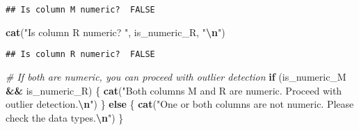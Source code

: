 \documentclass[
]{article}
\newenvironment{Shaded}{\begin{snugshade}}{\end{snugshade}}
\newcommand{\CommentTok}[1]{\textcolor[rgb]{0.56,0.35,0.01}{\textit{#1}}}
\newcommand{\ControlFlowTok}[1]{\textcolor[rgb]{0.13,0.29,0.53}{\textbf{#1}}}
\newcommand{\FunctionTok}[1]{\textcolor[rgb]{0.13,0.29,0.53}{\textbf{#1}}}
\newcommand{\NormalTok}[1]{#1}
\newcommand{\OtherTok}[1]{\textcolor[rgb]{0.56,0.35,0.01}{#1}}
\newcommand{\SpecialCharTok}[1]{\textcolor[rgb]{0.81,0.36,0.00}{\textbf{#1}}}
\newcommand{\StringTok}[1]{\textcolor[rgb]{0.31,0.60,0.02}{#1}}
\begin{document}
\begin{Shaded}
\end{Shaded}

\begin{verbatim}
## Is column M numeric?  FALSE
\end{verbatim}

\begin{Shaded}
\begin{Highlighting}[]
\FunctionTok{cat}\NormalTok{(}\StringTok{"Is column R numeric? "}\NormalTok{, is\_numeric\_R, }\StringTok{"}\SpecialCharTok{\textbackslash{}n}\StringTok{"}\NormalTok{)}
\end{Highlighting}
\end{Shaded}

\begin{verbatim}
## Is column R numeric?  FALSE
\end{verbatim}

\begin{Shaded}
\begin{Highlighting}[]
\CommentTok{\# If both are numeric, you can proceed with outlier detection}
\ControlFlowTok{if}\NormalTok{ (is\_numeric\_M }\SpecialCharTok{\&\&}\NormalTok{ is\_numeric\_R) \{}
  \FunctionTok{cat}\NormalTok{(}\StringTok{"Both columns M and R are numeric. Proceed with outlier detection.}\SpecialCharTok{\textbackslash{}n}\StringTok{"}\NormalTok{)}
\NormalTok{\} }\ControlFlowTok{else}\NormalTok{ \{}
  \FunctionTok{cat}\NormalTok{(}\StringTok{"One or both columns are not numeric. Please check the data types.}\SpecialCharTok{\textbackslash{}n}\StringTok{"}\NormalTok{)}
\NormalTok{\}}
\end{Highlighting}
\end{Shaded}
\end{document}
